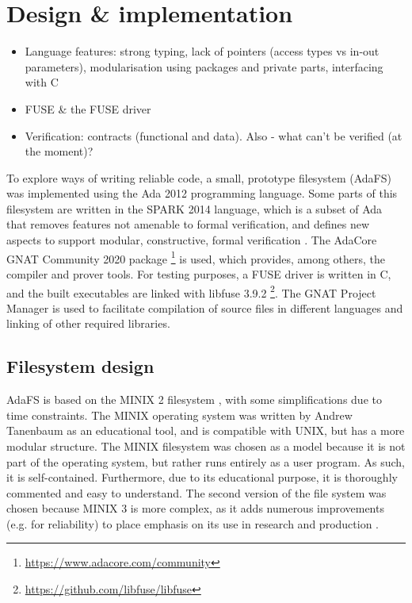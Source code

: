 \section{Design \& implementation}
\begin{itemize}
  \item Language features: strong typing, lack of pointers (access types vs in-out parameters), modularisation using packages and private parts, interfacing with C
  \item FUSE \& the FUSE driver
  \item Verification: contracts (functional and data). Also - what can't be verified (at the moment)?
\end{itemize}

To explore ways of writing reliable code, a small, prototype filesystem (AdaFS) was implemented using the Ada 2012 programming language.
Some parts of this filesystem are written in the SPARK 2014 language, which is a subset of Ada that removes features not amenable to formal verification, and defines new aspects to support modular, constructive, formal verification \cite{sparkRM}.
The AdaCore GNAT Community 2020 package \footnote{\url{https://www.adacore.com/community}} is used, which provides, among others, the compiler and prover tools.
For testing purposes, a FUSE driver is written in C, and the built executables are linked with libfuse 3.9.2 \footnote{\url{https://github.com/libfuse/libfuse}}.
The GNAT Project Manager is used to facilitate compilation of source files in different languages and linking of other required libraries.

\subsection{Filesystem design}
AdaFS is based on the MINIX 2 filesystem \cite{tanenbaum1997}, with some simplifications due to time constraints.
The MINIX operating system was written by Andrew Tanenbaum as an educational tool, and is compatible with UNIX, but has a more modular structure.
The MINIX filesystem was chosen as a model because it is not part of the operating system, but rather runs entirely as a user program.
As such, it is self-contained.
Furthermore, due to its educational purpose, it is thoroughly commented and easy to understand.
The second version of the file system was chosen because MINIX 3 is more complex, as it adds numerous improvements (e.g. for reliability) to place emphasis on its use in research and production \cite{minix3history}.

